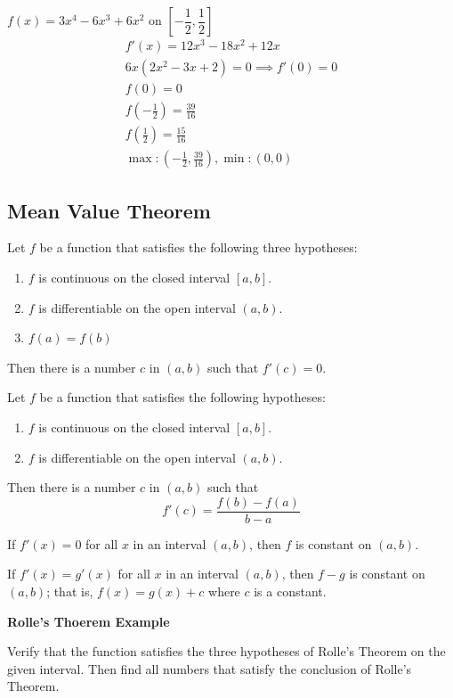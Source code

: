 \documentclass{article}
\newcommand{\theorem}[2]{\begin{tcolorbox}[title={#1},colback=blue!5!white,colframe=blue!75!black,parbox=false] #2 \end{tcolorbox}}
\begin{document}
$f(x)=3x^4-6x^3+6x^2$ on $\left[ -\dfrac{1}{2}, \dfrac{1}{2} \right]$
\begin{gather*}
    f'(x)=12x^3-18x^2+12x\\
    6x(2x^2-3x+2)=0 \implies f'(0)=0\\
    f(0)=0\\
    f(-\frac{1}{2})=\frac{39}{16}\\
    f(\frac{1}{2})=\frac{15}{16}\\
    \boxed{\max:(-\frac{1}{2},\frac{39}{16}),\min :(0, 0)}
\end{gather*}

\subsection{Mean Value Theorem}

\theorem{Rolle’s Theorem}{
Let $f$ be a function that satisfies the following three hypotheses:
\begin{enumerate}
\item $f$ is continuous on the closed interval $[a, b]$.
\item $f$ is differentiable on the open interval $(a, b)$.
\item $f(a) = f(b)$
\end{enumerate}
Then there is a number $c$ in $(a, b)$ such that $f'(c) = 0$.
}

\theorem{The Mean Value Theorem}{
Let $f$ be a function that satisfies the following hypotheses:
\begin{enumerate}
\item $f$ is continuous on the closed interval $[a, b]$.
\item $f$ is differentiable on the open interval $(a, b)$.
\end{enumerate}
Then there is a number $c$ in $(a, b)$ such that
\[
f'(c) = \frac{f(b) - f(a)}{b - a}
\]
}

\theorem{Theorem}{
If $f'(x) = 0$ for all $x$ in an interval $(a, b)$, then $f$ is constant on $(a, b)$.
}

\theorem{Corollary}{
If $f'(x) = g'(x)$ for all $x$ in an interval $(a, b)$, then $f - g$ is constant on $(a, b)$; that is, $f(x) = g(x) + c$ where $c$ is a constant.
}

\textbf{Rolle's Thoerem Example}

Verify that the function satisfies the three hypotheses of Rolle's Theorem on the given interval. Then find all numbers that satisfy the conclusion of Rolle's Theorem. 
\end{document}
